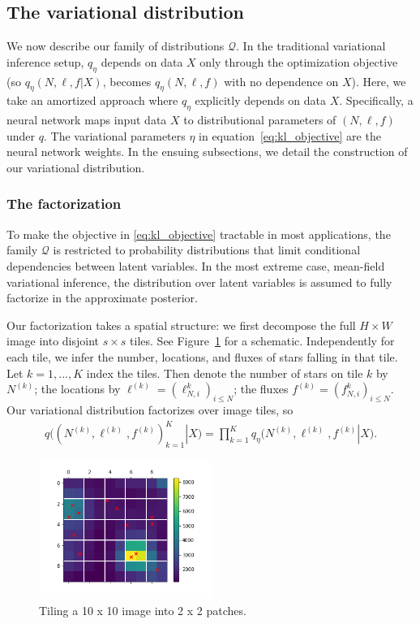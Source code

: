 \subsection{The variational distribution}
We now describe our family of distributions $\mathcal{Q}$. 
In the traditional variational inference setup, 
$q_\eta$ depends on data $X$ only through the optimization objective 
(so $q_\eta(N, \ell, f | X)$,
becomes $q_\eta(N, \ell, f)$ with no dependence on $X$). 
Here, we take an amortized approach where
$q_\eta$ explicitly depends on data $X$. Specifically, a neural network 
maps input data $X$ to distributional parameters of $(N, \ell, f)$ 
under $q$. The variational parameters $\eta$ in equation~\eqref{eq:kl_objective} 
are the neural network weights. 
In the ensuing subsections, we detail the construction of our variational distribution. 

\subsubsection{The factorization}
To make the objective in \eqref{eq:kl_objective} tractable in most 
applications, the family $\mathcal{Q}$ is restricted to probability distributions 
that limit conditional dependencies between latent variables. In the most extreme case, mean-field variational inference, 
the distribution over latent variables is assumed to fully factorize in the approximate posterior. 

Our factorization takes a spatial structure: we first decompose the full 
$H \times W$ image into disjoint $s \times s$ tiles. See Figure~\ref{fig:ex_tiles} for a schematic. 
Independently for each tile, we infer the number, locations, and fluxes of stars falling in that tile.
Let $k = 1, ..., K$ index the tiles. Then
denote the number of stars on tile $k$ by $N^{(k)}$;
the locations by $\ell^{(k)} = (\ell_{N, i}^k)_{i \leq N}$; 
the fluxes $f^{(k)} = (f_{N, i}^k)_{i \leq N}$. Our variational 
distribution factorizes over image tiles, so
\begin{align}
    q\big((N^{(k)}, \ell^{(k)}, f^{(k)})_{k = 1}^K|X\big) = \prod_{k = 1}^K q_\eta\big(N^{(k)}, \ell^{(k)}, f^{(k)} | X\big). 
\end{align}

\begin{figure}[h]
    \centering
    \includegraphics[width = 0.5\textwidth]{figures/example_tiled.png}
    \vspace{-1cm}
    \caption{Tiling a 10 x 10 image into 2 x 2 patches. }
    \label{fig:ex_tiles}
\end{figure}


